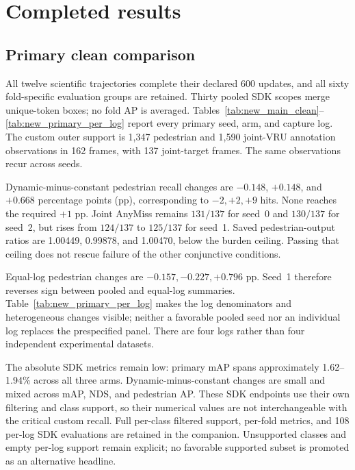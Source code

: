 \section{Completed results}
\subsection{Primary clean comparison}
All twelve scientific trajectories complete their declared 600 updates, and all sixty fold-specific evaluation groups are retained. Thirty pooled SDK scopes merge unique-token boxes; no fold AP is averaged. Tables~\ref{tab:new_main_clean}--\ref{tab:new_primary_per_log} report every primary seed, arm, and capture log. The custom outer support is 1,347 pedestrian and 1,590 joint-VRU annotation observations in 162 frames, with 137 joint-target frames. The same observations recur across seeds.





Dynamic-minus-constant pedestrian recall changes are $-0.148$, $+0.148$, and $+0.668$ percentage points (pp), corresponding to $-2,+2,+9$ hits. None reaches the required $+1$ pp. Joint AnyMiss remains $131/137$ for seed~0 and $130/137$ for seed~2, but rises from $124/137$ to $125/137$ for seed~1. Saved pedestrian-output ratios are 1.00449, 0.99878, and 1.00470, below the burden ceiling. Passing that ceiling does not rescue failure of the other conjunctive conditions.

Equal-log pedestrian changes are $-0.157,-0.227,+0.796$ pp. Seed~1 therefore reverses sign between pooled and equal-log summaries. Table~\ref{tab:new_primary_per_log} makes the log denominators and heterogeneous changes visible; neither a favorable pooled seed nor an individual log replaces the prespecified panel. There are four logs rather than four independent experimental datasets.

The absolute SDK metrics remain low: primary mAP spans approximately 1.62--1.94\% across all three arms. Dynamic-minus-constant changes are small and mixed across mAP, NDS, and pedestrian AP. These SDK endpoints use their own filtering and class support, so their numerical values are not interchangeable with the critical custom recall. Full per-class filtered support, per-fold metrics, and 108 per-log SDK evaluations are retained in the companion. Unsupported classes and empty per-log support remain explicit; no favorable supported subset is promoted as an alternative headline.

